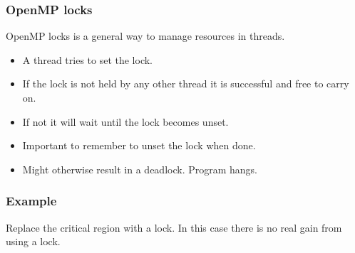 \subsubsection{OpenMP locks}\label{openmp-locks}

OpenMP locks is a general way to manage resources in threads.

\begin{itemize}
\itemsep1pt\parskip0pt
\item
  A thread tries to set the lock.
\item
  If the lock is not held by any other thread it is successful and free
  to carry on.
\item
  If not it will wait until the lock becomes unset.
\item
  Important to remember to unset the lock when done.
\item
  Might otherwise result in a deadlock. Program hangs.
\end{itemize}

\subsubsection{Example}\label{example-5}

Replace the critical region with a lock. In this case there is no real
gain from using a lock.

\begin{Shaded}
\begin{Highlighting}[]

   
\NormalTok{\{}
     
      \NormalTok{;}
      
    \NormalTok{;}
    \NormalTok{;}
    \NormalTok{\{}
         \NormalTok{(} 
        \NormalTok{\{}
            \NormalTok{);}
            \NormalTok{/(} 
        \NormalTok{\}}
    \NormalTok{\}}
     
\NormalTok{\}}
\end{Highlighting}
\end{Shaded}

